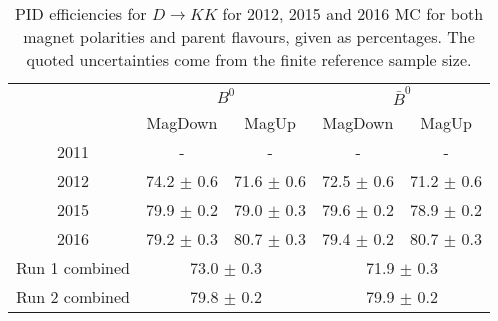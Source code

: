 \begin{table}
    \centering
    \begin{tabular}{ccccc}
        \toprule
        & \multicolumn{2}{c}{$B^0$} &  \multicolumn{2}{c}{$\bar{B}^0$}\\
        & MagDown & MagUp & MagDown & MagUp\\
        \midrule
2011 & - & - & - & - \\
2012 & 74.2 $\pm$ 0.6 & 71.6 $\pm$ 0.6 & 72.5 $\pm$ 0.6 & 71.2 $\pm$ 0.6 \\
2015 & 79.9 $\pm$ 0.2 & 79.0 $\pm$ 0.3 & 79.6 $\pm$ 0.2 & 78.9 $\pm$ 0.2 \\
2016 & 79.2 $\pm$ 0.3 & 80.7 $\pm$ 0.3 & 79.4 $\pm$ 0.2 & 80.7 $\pm$ 0.3 \\
        \midrule
Run 1 combined & \multicolumn{2}{c}{73.0 $\pm$ 0.3} & \multicolumn{2}{c}{71.9 $\pm$ 0.3} \\
Run 2 combined & \multicolumn{2}{c}{79.8 $\pm$ 0.2} & \multicolumn{2}{c}{79.9 $\pm$ 0.2} \\
        \bottomrule
    \end{tabular}
    \caption{PID efficiencies for $D \to KK$ for 2012, 2015 and 2016 MC for both magnet polarities and parent flavours, given as percentages. The quoted  uncertainties come from the finite reference sample size.}
\label{tab:PID_efficiency_KK}
\end{table}
